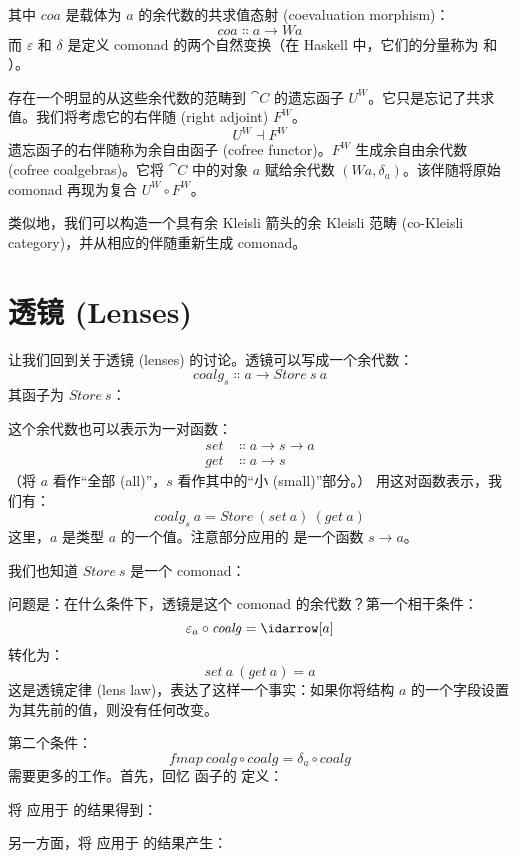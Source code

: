 \noindent
其中 $\mathit{coa}$ 是载体为 $a$ 的余代数的共求值态射 (coevaluation morphism)：
\[\mathit{coa} \Colon a \to W a\]
而 $\varepsilon$ 和 $\delta$ 是定义 comonad 的两个自然变换（在 Haskell 中，它们的分量称为  和 ）。

存在一个明显的从这些余代数的范畴到 $\cat{C}$ 的遗忘函子 $U^W$。它只是忘记了共求值。我们将考虑它的右伴随 (right adjoint) $F^W$。
\[U^W \dashv F^W\]
遗忘函子的右伴随称为余自由函子 (cofree functor)。$F^W$ 生成余自由余代数 (cofree coalgebras)。它将 $\cat{C}$ 中的对象 $a$ 赋给余代数 $(W a, \delta_a)$。该伴随将原始 comonad 再现为复合 $U^W \circ F^W$。

类似地，我们可以构造一个具有余 Kleisli 箭头的余 Kleisli 范畴 (co-Kleisli category)，并从相应的伴随重新生成 comonad。

\section{透镜 (Lenses)}

让我们回到关于透镜 (lenses) 的讨论。透镜可以写成一个余代数：
\[\mathit{coalg}_s \Colon a \to \mathit{Store}\ s\ a\]
其函子为 $\mathit{Store}\ s$：

这个余代数也可以表示为一对函数：
\begin{align*}
  \mathit{set} & \Colon a \to s \to a \\
  \mathit{get} & \Colon a \to s
\end{align*}
（将 $a$ 看作“全部 (all)”，$s$ 看作其中的“小 (small)”部分。） 用这对函数表示，我们有：
\[\mathit{coalg}_s\ a = \mathit{Store}\ (\mathit{set}\ a)\ (\mathit{get}\ a)\]
这里，$a$ 是类型 $a$ 的一个值。注意部分应用的  是一个函数 $s \to a$。

我们也知道 $\mathit{Store}\ s$ 是一个 comonad：

问题是：在什么条件下，透镜是这个 comonad 的余代数？第一个相干条件：
\[\varepsilon_a \circ \mathit{coalg} = \idarrow[a]\]
转化为：
\[\mathit{set}\ a\ (\mathit{get}\ a) = a\]
这是透镜定律 (lens law)，表达了这样一个事实：如果你将结构 $a$ 的一个字段设置为其先前的值，则没有任何改变。

第二个条件：
\[\mathit{fmap}\ \mathit{coalg} \circ \mathit{coalg} = \delta_a \circ \mathit{coalg}\]
需要更多的工作。首先，回忆  函子的  定义：

将  应用于  的结果得到：

另一方面，将  应用于  的结果产生：

